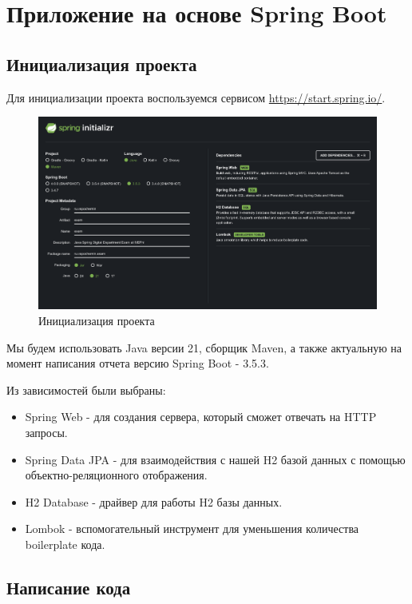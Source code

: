 \documentclass[a4paper, 14pt]{article}
\begin{document}
\newpage
\section{Приложение на основе Spring Boot}

\subsection{Инициализация проекта}

Для инициализации проекта воспользуемся сервисом \url{https://start.spring.io/}.

\begin{figure}[H]
	\centering
	\includegraphics[width=17cm]{resources/1.png}
	\caption{Инициализация проекта}
\end{figure}

Мы будем использовать Java версии 21, сборщик Maven, а также актуальную на момент написания отчета версию Spring Boot - 3.5.3.


Из зависимостей были выбраны:

\begin{itemize}
	\item Spring Web - для создания сервера, который сможет отвечать на HTTP запросы.
	\item Spring Data JPA - для взаимодействия с нашей H2 базой данных с помощью объектно-реляционного отображения.
	\item H2 Database - драйвер для работы H2 базы данных.
	\item Lombok - вспомогательный инструмент для уменьшения количества boilerplate кода.
\end{itemize}

\subsection{Написание кода}
\end{document}
